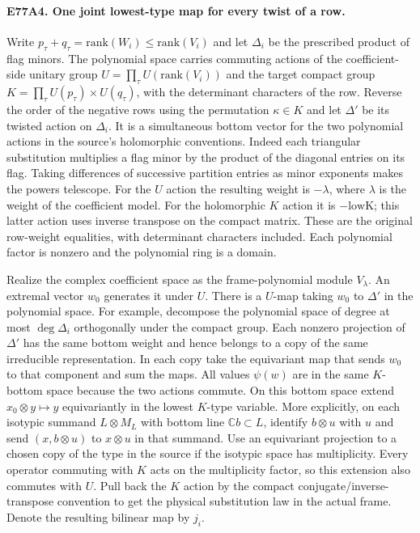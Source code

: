 \paragraph{E77A4. One joint lowest-type map for every twist of a row.}
Write $p_\tau+q_\tau=\mathrm{rank}(W_i)\le\mathrm{rank}(V_i)$
and let $\Delta_i$ be the prescribed product of flag minors. The
polynomial space carries commuting actions of the coefficient-side
unitary group $U=\prod_\tau U(\mathrm{rank}(V_i))$ and the target
compact group $K=\prod_\tau U(p_\tau)\times U(q_\tau)$, with the
determinant characters of the row. Reverse the order of the negative
rows using the permutation $\kappa\in K$ and let $\Delta'$ be its
twisted action on $\Delta_i$. It is a simultaneous bottom vector for
the two polynomial actions in the source's holomorphic conventions.
Indeed each triangular substitution multiplies a flag minor by the
product of the diagonal entries on its flag. Taking differences of
successive partition entries as minor exponents makes the powers
telescope. For the $U$ action the resulting weight is $-\lambda$,
where $\lambda$ is the weight of the coefficient model. For the
holomorphic $K$ action it is $-\mathrm{lowK}$; this latter action uses
inverse transpose on the compact matrix. These are the original
row-weight equalities, with determinant characters included.
Each polynomial factor is nonzero and the polynomial ring is a domain.

Realize the complex coefficient space as the frame-polynomial
module $V_\lambda$. An extremal vector $w_0$ generates it under $U$.
There is a $U$-map taking $w_0$ to $\Delta'$ in the polynomial space.
For example, decompose the polynomial space of degree at most
$\deg\Delta_i$ orthogonally under the compact group. Each nonzero
projection of $\Delta'$ has the same bottom weight and hence belongs
to a copy of the same irreducible representation. In each copy take
the equivariant map that sends $w_0$ to that component and sum the
maps. All values $\psi(w)$ are in the same $K$-bottom space because
the two actions commute. On this bottom space extend
$x_0\otimes y\mapsto y$ equivariantly in the lowest $K$-type
variable. More explicitly, on each isotypic summand $L\otimes M_L$
with bottom line $\mathbb C b\subset L$, identify $b\otimes u$ with
$u$ and send $(x,b\otimes u)$ to $x\otimes u$ in that summand.
Use an equivariant projection to a chosen copy of the type in the
source if the isotypic space has multiplicity. Every operator commuting
with $K$ acts on the multiplicity factor, so this extension also
commutes with $U$. Pull back the $K$ action by the compact
conjugate/inverse-transpose convention to get the physical substitution
law in the actual frame. Denote the resulting bilinear map by $j_i$.

